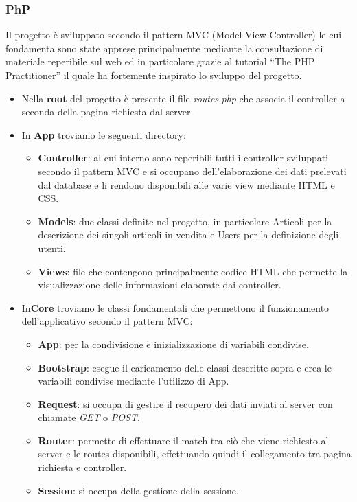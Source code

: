 \subsubsection{PhP}
Il progetto è sviluppato secondo il pattern MVC (Model-View-Controller) le cui fondamenta sono state apprese principalmente mediante la consultazione di materiale reperibile sul web ed in particolare grazie al tutorial “The PHP Practitioner” il quale ha fortemente inspirato lo sviluppo del progetto.
\begin{itemize}
	\item Nella \textbf{root} del progetto è presente il file \textit{routes.php} che associa il controller a seconda della pagina richiesta dal server.
	\item In \textbf{App} troviamo le seguenti directory:
	\begin{itemize}
		\item \textbf{Controller}: al cui interno sono reperibili tutti i controller sviluppati secondo il pattern MVC e si occupano dell’elaborazione dei dati prelevati dal database e li rendono disponibili alle varie view mediante HTML e CSS.
		\item \textbf{Models}: due classi definite nel progetto, in particolare Articoli per la descrizione dei singoli articoli in vendita e Users per la definizione degli utenti.
		\item \textbf{Views}: file che contengono principalmente codice HTML che permette la visualizzazione delle informazioni elaborate dai controller.
	\end{itemize} 
	\item In\textbf{Core} troviamo le classi fondamentali che permettono il funzionamento dell'applicativo secondo il pattern MVC:
	\begin{itemize}
		\item \textbf{App}: per la condivisione e inizializzazione di variabili condivise.
		\item \textbf{Bootstrap}: esegue il caricamento delle classi descritte sopra e crea le variabili condivise mediante l’utilizzo di App.
		\item \textbf{Request}: si occupa di gestire il recupero dei dati inviati al server con chiamate \textit{GET} o \textit{POST}.
		\item \textbf{Router}: permette di effettuare il match tra ciò che viene richiesto al server e le routes disponibili, effettuando quindi il collegamento tra pagina richiesta e controller.
		\item \textbf{Session}: si occupa della gestione della sessione.
	\end{itemize} 
\end{itemize}

